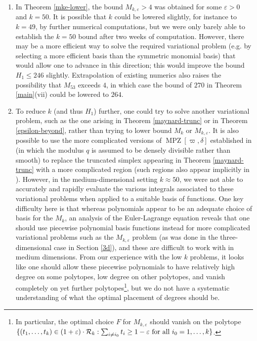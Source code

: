 \documentclass{bmcart}
\DeclareMathOperator*\MPZ{MPZ}
\theoremstyle{plain}
\theoremstyle{definition}
\newcommand\eps{\varepsilon}
\begin{document}
\begin{enumerate}
\item In Theorem \ref{mke-lower}, the bound $M_{k,\eps} > 4$ was obtained for some $\eps>0$ and $k=50$.  It is possible that $k$ could be lowered slightly, for instance to $k=49$, by further numerical computations, but we were only barely able to establish the $k=50$ bound after two weeks of computation.  However, there may be a more efficient way to solve the required variational problem (e.g. by selecting a more efficient basis than the symmetric monomial basis) that would allow one to advance in this direction; this would improve the bound $H_1 \leq 246$ slightly.  Extrapolation of existing numerics also raises the possibility that $M_{53}$ exceeds $4$, in which case the bound of $270$ in Theorem \ref{main}(vii) could be lowered to $264$.
\item To reduce $k$ (and thus $H_1$) further, one could try to solve another variational problem, such as the one arising in Theorem \ref{maynard-trunc} or in Theorem \ref{epsilon-beyond}, rather than trying to lower bound $M_k$ or $M_{k,\eps}$.  It is also possible to use the more complicated versions of $\MPZ[\varpi,\delta]$ established in \cite{polymath8a} (in which the modulus $q$ is assumed to be densely divisible rather than smooth) to replace the truncated simplex appearing in Theorem \ref{maynard-trunc} with a more complicated region (such regions also appear implicitly in \cite[\S 4.5]{polymath8a}).  However, in the medium-dimensional setting $k \approx 50$, we were not able to accurately and rapidly evaluate the various integrals associated to these variational problems when applied to a suitable basis of functions.  One key difficulty here is that whereas polynomials appear to be an adequate choice of basis for the $M_k$, an analysis of the Euler-Lagrange equation reveals that one should use piecewise polynomial basis functions instead for more complicated variational problems such as the $M_{k,\eps}$ problem (as was done in the three-dimensional case in Section \ref{3d}), and these are difficult to work with in medium dimensions.  From our experience with the low $k$ problems, it looks like one should allow these piecewise polynomials to have relatively high degree on some polytopes, low degree on other polytopes, and vanish completely on yet further polytopes\footnote{In particular, the optimal choice $F$ for $M_{k,\eps}$ should vanish on the polytope $\{ (t_1,\dots,t_k) \in (1+\eps) \cdot {\mathcal R}_k: \sum_{i \neq i_0} t_i \ge 1-\eps \hbox{ for all } i_0=1,\dots,k\}$.}, but we do not have a systematic understanding of what the optimal placement of degrees should be.  

\end{enumerate}
\end{document}
